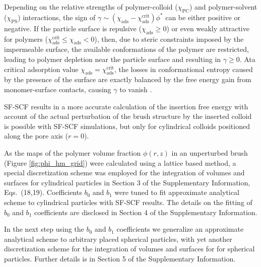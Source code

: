 \documentclass[12pt, a4paper]{article}
\begin{document}
Depending on the relative strengths of polymer-colloid ($\chi_{\text{PC}}$) and polymer-solvent ($\chi_{\text{PS}}$) interactions, the sign of $\gamma \sim (\chi_{\text{ads}} - \chi_{\text{ads}}^{\text{crit}}) \phi^{\ast}$ can be either positive or negative.
If the particle surface is repulsive ($\chi_{\text{ads}} \geq 0$) or even weakly attractive for polymers ($\chi_{\text{ads}}^{\text{crit}} \leq \chi_{\text{ads}} < 0$), then, due to steric constraints imposed by the impermeable surface, the available conformations of the polymer are restricted, leading to polymer depletion near the particle surface and resulting in $\gamma \geq 0$.
Ata critical adsorption value $\chi_{\text{ads}} = \chi_{\text{ads}}^{\text{crit}}$, the losses in conformational entropy caused by the presence of the surface are exactly balanced by the free energy gain from monomer-surface contacts, causing $\gamma$ to vanish \cite{Fleer1993,Birshtein1979,Birshtein1983,Eisenriegler1982}.

SF-SCF results in a more accurate calculation of the insertion free energy with account of the actual perturbation of the brush structure by the inserted colloid is possible with SF-SCF simulations, but only for cylindrical colloids positioned along the pore axis ($r=0$).

As the maps of the polymer volume fraction $\phi(r,z)$ in an unperturbed brush (Figure \ref{fig:phi_hm_grid}) were calculated using a lattice based method, a special discretization scheme was employed for the integration of volumes and surfaces for cylindrical particles in
Section 3 of the Supplementary Information, Eqs.~(18,19).
Coefficients $b_0$ and $b_1$ were tuned to fit approximate analytical scheme to cylindrical particles with SF-SCF results.
The details on the fitting of $b_0$ and $b_1$ coefficients are disclosed in Section 4 of the Supplementary Information.

In the next step using the $b_0$ and $b_1$ coefficients we generalize an approximate analytical scheme to arbitrary placed spherical particles, with yet another discretization scheme for the integration of volumes and surfaces for for spherical particles.
Further details is in Section 5 of the Supplementary Information.
\end{document}
